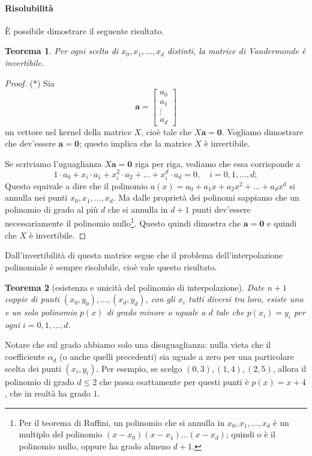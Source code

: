 \documentclass[a4paper]{report}
\newtheorem{theorem}{Teorema}[chapter]
\theoremstyle{definiton}
\theoremstyle{remark}
\begin{document}
\paragraph{Risolubilità} È possibile dimostrare il seguente risultato.
\begin{theorem}
Per ogni scelta di $x_0,x_1,\dots, x_d$ \emph{distinti}, la matrice di Vandermonde è invertibile.
\end{theorem}
\begin{proof} (*)
Sia
\[
\mathbf{a} = \begin{bmatrix}
    a_0\\
    a_1\\
    \vdots\\
    a_d
\end{bmatrix}
\]
un vettore nel kernel della matrice $X$, cioè tale che $X\mathbf{a} = \mathbf{0}$. Vogliamo dimostrare che dev'essere $\mathbf{a} = \mathbf{0}$; questo implica che la matrice $X$ è invertibile.

Se scriviamo l'uguaglianza $X\mathbf{a} = \mathbf{0}$ riga per riga, vediamo che essa corrisponde a
\[
1\cdot a_0 + x_i \cdot a_1 + x_i^2 \cdot a_2 + \dots + x_i^d \cdot a_d = 0, \quad i=0,1,\dots,d;
\]
Questo equivale a dire che il polinomio $a(x) = a_0 + a_1 x + a_2 x^2 + \dots + a_d x^d$ si annulla nei punti $x_0, x_1, \dots, x_d$. Ma dalle proprietà dei polinomi sappiamo che un polinomio di grado al più $d$ che si annulla in $d+1$ punti dev'essere necessariamente il polinomio nullo\footnote{Per il teorema di Ruffini, un polinomio che si annulla in $x_0,x_1,\dots,x_d$ è un multiplo del polinomio $(x-x_0)(x-x_1)\dots (x-x_d)$; quindi o è il polinomio nullo, oppure ha grado almeno $d+1$.}. Questo quindi dimostra che $\mathbf{a}=\mathbf{0}$ e quindi che $X$ è invertibile.
\end{proof}
Dall'invertibilità di questa matrice segue che il problema dell'interpolazione polinomiale è sempre risolubile, cioè vale questo risultato.
\begin{theorem}[esistenza e unicità del polinomio di interpolazione]
Date $n+1$ coppie di punti $(x_0,y_0),\dots,(x_d,y_d)$, con gli $x_i$ tutti diversi tra loro, esiste uno e un solo polinomio $p(x)$ di grado minore o uguale a $d$ tale che $p(x_i)=y_i$ per ogni $i=0,1,\dots,d$.
\end{theorem}

Notare che sul grado abbiamo solo una disuguaglianza: nulla vieta che il coefficiente $\alpha_d$ (o anche quelli precedenti) sia uguale a zero per una particolare scelta dei punti $(x_i,y_i)$. Per esempio, se scelgo $(0,3), (1,4), (2,5)$, allora il polinomio di grado $d\leq 2$ che passa esattamente per questi punti è $p(x)=x+4$, che in realtà ha grado $1$.
\end{document}
